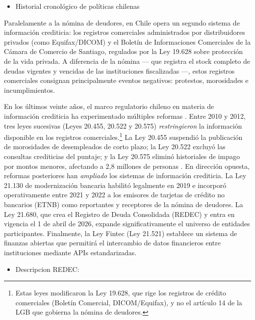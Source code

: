 \documentclass[11pt]{article}
\theoremstyle{plain}
\theoremstyle{plain}
\begin{document}
\begin{itemize}
    \item Historial cronológico de políticas chilenas%
\end{itemize}   

Paralelamente a la nómina de deudores, en Chile opera un segundo sistema de información crediticia: los registros comerciales administrados por distribuidores privados (como Equifax/DICOM) y el Boletín de Informaciones Comerciales de la Cámara de Comercio de Santiago, regulados por la Ley 19.628 sobre protección de la vida privada. A diferencia de la nómina --- que registra el stock completo de deudas vigentes y vencidas de las instituciones fiscalizadas ---, estos registros comerciales consignan principalmente eventos negativos: protestos, morosidades e incumplimientos.

En los últimos veinte años, el marco regulatorio chileno en materia de información crediticia ha experimentado múltiples reformas . Entre 2010 y 2012, tres leyes sucesivas (Leyes 20.455, 20.522 y 20.575) \textit{restringieron} la información disponible en los registros comerciales.\footnote{Estas leyes modificaron la Ley 19.628, que rige los registros de crédito comerciales (Boletín Comercial, DICOM/Equifax), y no el artículo 14 de la LGB que gobierna la nómina de deudores.} La Ley 20.455 suspendió la publicación de morosidades de desempleados de corto plazo; la Ley 20.522 excluyó las consultas crediticias del puntaje; y la Ley 20.575 eliminó historiales de impago por montos menores, afectando a 2,8 millones de personas \parencite{liberman_equilibrium_2018, madeira_impact_2024}. En dirección opuesta, reformas posteriores han \textit{ampliado} los sistemas de información crediticia. La Ley 21.130 de modernización bancaria habilitó legalmente en 2019 e incorporó operativamente entre 2021 y 2022 a los emisores de tarjetas de crédito no bancarios (ETNB) como reportantes y receptores de la nómina de deudores. La Ley 21.680, que crea el Registro de Deuda Consolidada (REDEC) y entra en vigencia el 1 de abril de 2026, expande significativamente el universo de entidades participantes. Finalmente, la Ley Fintec (Ley 21.521) establece un sistema de finanzas abiertas que permitirá el intercambio de datos financieros entre instituciones mediante APIs estandarizadas.
\begin{itemize}
    \item Descripcion REDEC: %
\end{itemize} 
\end{document}
